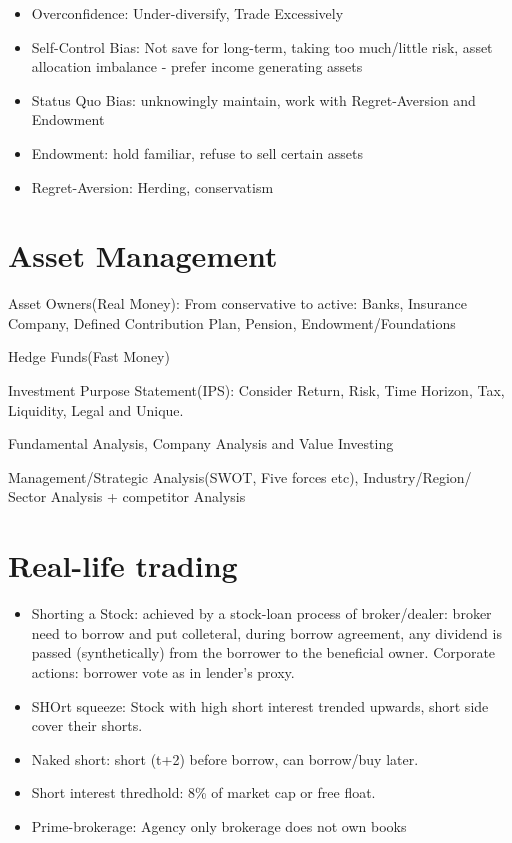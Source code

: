 \documentclass[11pt, openany]{book}              %
\begin{document}
\begin{itemize}
\begin{itemize}
    		\item Overconfidence: Under-diversify, Trade Excessively 
    		\item Self-Control Bias: Not save for long-term, taking too much/little risk, asset allocation imbalance - prefer income generating assets
    		\item Status Quo Bias: unknowingly maintain, work with Regret-Aversion and Endowment
    		\item Endowment: hold familiar, refuse to sell certain assets
    		\item Regret-Aversion: Herding, conservatism
    		\end{itemize}
\end{itemize}


\section{Asset Management}

Asset Owners(Real Money): From conservative to active: Banks, Insurance Company, Defined Contribution Plan, Pension, Endowment/Foundations 

Hedge Funds(Fast Money)

Investment Purpose Statement(IPS): Consider Return, Risk, Time Horizon, Tax, Liquidity, Legal and Unique. 


Fundamental Analysis, Company Analysis and Value Investing

Management/Strategic Analysis(SWOT, Five forces etc), Industry/Region/ Sector Analysis + competitor Analysis 

\section{ Real-life trading}

\begin{itemize}
    \item Shorting a Stock: achieved by a stock-loan process of broker/dealer: broker need to borrow and put colleteral, during borrow agreement, any dividend is passed (synthetically) from the borrower to the beneficial owner. Corporate actions: borrower vote as in lender's proxy. 
    \item SHOrt squeeze: Stock with high short interest trended upwards, short side cover their shorts.
    \item Naked short: short (t+2) before borrow, can borrow/buy later.
    \item Short interest thredhold: 8\% of market cap or free float.
    \item Prime-brokerage: Agency only brokerage does not own books
\end{itemize}
\end{document}
